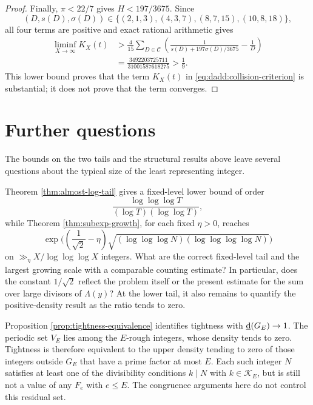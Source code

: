 \documentclass[11pt,letterpaper,reqno]{amsart}
\numberwithin{equation}{section}
\theoremstyle{remark}
\newcommand{\lowerdens}{\underline{\textup{d}}}
\renewcommand{\leq}{\leqslant}
\begin{document}
\begin{proof}
Finally, $\pi<22/7$ gives $H<197/3675$. Since
\[
 (D,s(D),\sigma(D))
 \in\{(2,1,3),(4,3,7),(8,7,15),(10,8,18)\},
\]
all four terms are positive and exact rational arithmetic gives
\begin{align*}
 \liminf_{X\to\infty}K_X(t)
 &>
 \frac4{15}
 \sum_{D\in\mathcal{C}}
 \left(\frac1{s(D)+197\sigma(D)/3675}-\frac1D\right)\\
 &=\frac{3492203725711}{31001587618275}
 >\frac19.
\end{align*}
This lower bound proves that the term $K_X(t)$ in
\eqref{eq:dadd:collision-criterion} is substantial; it does not
prove that the term converges.
\end{proof}


\section{Further questions}

The bounds on the two tails and the structural results above leave several questions about the typical size of the least representing integer.

Theorem \ref{thm:almost-log-tail} gives a fixed-level lower bound of order
\[
 \frac{\log\log\log T}{(\log T)(\log\log T)},
\]
while Theorem \ref{thm:subexp-growth}, for each fixed $\eta>0$, reaches
\[
 \exp\biggl(\left(\frac1{\sqrt2}-\eta\right)
 \sqrt{(\log\log\log N)(\log\log\log\log N)}\biggr)
\]
on
$\gg_\eta X/\log\log\log X$ integers. What are the correct fixed-level tail and the
largest growing scale with a comparable counting estimate? In
particular, does the constant $1/\sqrt2$ reflect the problem itself or the
present estimate for the sum over large divisors of $\Lambda(y)$? At the lower tail, it also
remains to quantify the positive-density result as the ratio tends to zero.

Proposition \ref{prop:tightness-equivalence} identifies tightness with
$\lowerdens(G_E)\to1$. The periodic set $V_E$ lies among the
$E$-rough integers, whose density tends to zero. Tightness is therefore
equivalent to the upper density tending to zero of those integers outside
$G_E$ that have a prime factor at most $E$. Each such integer $N$ satisfies at least
one of the divisibility conditions $k\mid N$ with $k\in\mathcal{K}_E$,
but is still not a value of any $F_e$ with $e\leq E$.
The congruence arguments here do not control this residual set.
\end{document}
